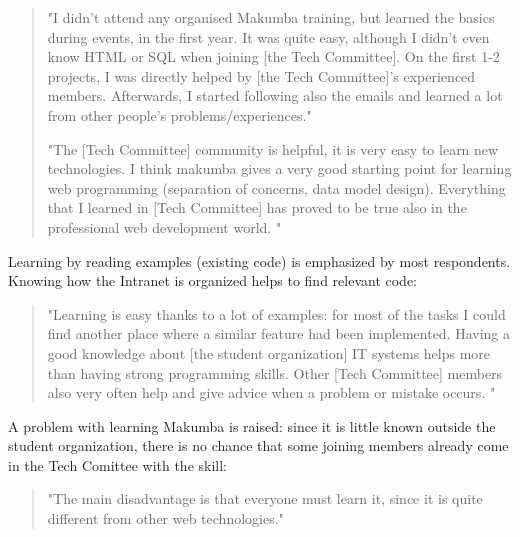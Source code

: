 \documentclass{sig-alt-release2}
\begin{document}
\begin{quotation}
	"I didn't attend any organised Makumba training, but learned the basics during events, in the first year. It was quite easy, although I didn't even know HTML or SQL when joining [the Tech Committee]. On the first 1-2 projects, I was directly helped by [the Tech Committee]'s experienced members. Afterwards, I started following also the emails and learned a lot from other people's problems/experiences."
	
	"The [Tech Committee] community is helpful, it is very easy to learn new technologies. I think makumba gives a very good starting point for learning web programming (separation of concerns, data model design). Everything that I learned in [Tech Committee] has proved to be true also in the professional web development world. "
\end{quotation}



Learning by reading examples (existing code) is emphasized by most respondents. Knowing how the Intranet is organized helps to find relevant code:
\begin{quotation}
	"Learning is easy thanks to a lot of examples: for most of the tasks I could find another place where a similar feature had been implemented. Having a good knowledge about [the student organization] IT systems helps more than having strong programming skills. Other [Tech Committee] members also very often help and give advice when a problem or mistake occurs. "
\end{quotation}

A problem with learning Makumba is raised: since it is little known outside the student organization, there is no chance that some joining members already come in the Tech Comittee with the skill:
\begin{quotation}
	"The main disadvantage is that everyone must learn it, since it is quite different from other web technologies."
\end{quotation}
\end{document}
